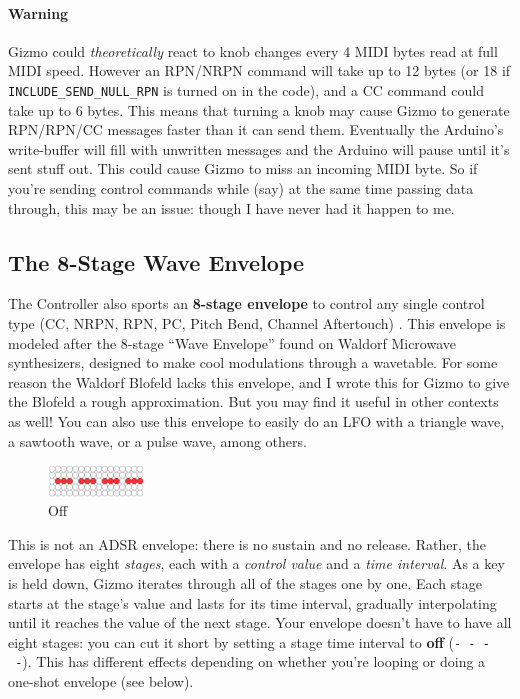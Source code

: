 \documentclass{article}
\begin{document}
\paragraph{Warning} Gizmo could {\it theoretically} react to knob changes every 4 MIDI bytes read at full MIDI speed.  However an RPN/NRPN command will take up to 12 bytes (or 18 if \texttt{INCLUDE\_SEND\_NULL\_RPN} is turned on in the code), and a CC command could take up to 6 bytes.  This means that turning a knob may cause Gizmo to generate RPN/RPN/CC messages faster than it can send them.  Eventually the Arduino's write-buffer will fill with unwritten messages and the Arduino will pause until it's sent stuff out.  This could cause Gizmo to miss an incoming MIDI byte.  So if you're sending control commands while (say) at the same time passing data through, this may be an issue: though I have never had it happen to me.

\subsection{The 8-Stage Wave Envelope}
\label{waveenvelope}

The Controller also sports an {\bf 8-stage envelope} to control any single control type (CC, NRPN, RPN, PC, Pitch Bend, Channel Aftertouch)%
.  This envelope is modeled after the 8-stage ``Wave Envelope'' found on Waldorf Microwave synthesizers, designed to make cool modulations through a wavetable.  For some reason the Waldorf Blofeld lacks this envelope, and I wrote this for Gizmo to give the Blofeld a rough approximation.  But you may find it useful in other contexts as well!  You can also use this envelope to easily do an LFO with a triangle wave, a sawtooth wave, or a pulse wave, among others.

\begin{figure}
\includegraphics[width=1in]{none.pdf}
\vspace{-2em}\caption{\small Off}\vspace{-1em}
\end{figure}

 This is not an ADSR envelope: there is no sustain and no release.  Rather, the envelope has eight {\it stages}, each with a {\it control value} and a {\it time interval}.  As a key is held down, Gizmo iterates through all of the stages one by one.  Each stage starts at the stage's value and lasts for its time interval, gradually interpolating until it reaches the value of the next stage.  Your envelope doesn't have to have all eight stages: you can cut it short by setting a stage time interval to {\bf off} (\texttt{-~-~-~-}).  This has different effects depending on whether you're looping or doing a one-shot envelope (see below).
\end{document}
